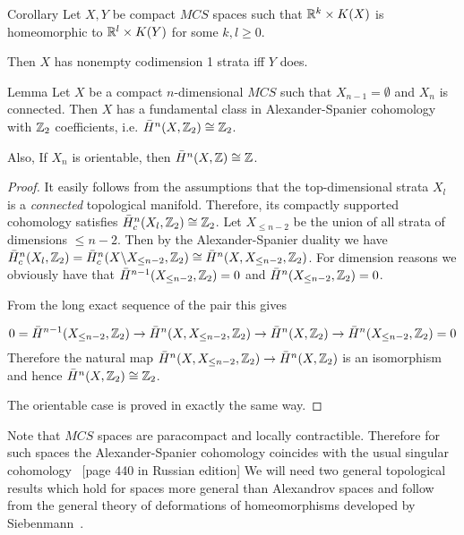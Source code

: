 \begin{thm}{Corollary}
Let $X,Y$ be compact $MCS$ spaces such that $\RR^k\times K(X)$ is homeomorphic to $\RR^l\times K(Y)$ for some $k,l\ge 0$.

Then $X$ has nonempty codimension 1 strata iff $Y$ does.
\end{thm}
\begin{thm}{Lemma}\label{top-gr-pet}
Let $X$ be a  compact $n$-dimensional $MCS$ such that $X_{n-1}=\emptyset$ and $X_n$ is connected. Then $X$ has a fundamental class in Alexander-Spanier cohomology with $\mathbb{Z}_2$ coefficients, i.e. $\bar H^{n}(X,\mathbb{Z}_2)\cong \mathbb{Z}_2$. 

Also, If $X_n$ is orientable, then   $\bar H^{n}(X,\mathbb{Z})\cong \mathbb{Z}$. 
\end{thm}
\begin{proof}
It easily follows from the assumptions that the top-dimensional strata $X_l$ is a {\it connected} topological manifold. Therefore, its compactly supported cohomology satisfies $\bar H^n_c(X_l,\mathbb{Z}_2)\cong \mathbb{Z}_2$.
Let $X_{\le n-2}$ be the union of all strata of dimensions $\le n-2$. Then by the Alexander-Spanier duality we have $\bar H^n_c(X_l,\ZZ_2)=\bar H^n_c(X\backslash X_{\le n-2},\ZZ_2)\cong \bar H^n(X, X_{\le n-2},\ZZ_2)$. 
For dimension reasons we obviously have that $\bar H^{n-1}(X_{\le n-2},\ZZ_2)=0$ and $\bar H^{n}(X_{\le n-2},\ZZ_2)=0$.

From the long exact sequence of the pair this gives

\[
0=\bar H^{n-1}(X_{\le n-2},\ZZ_2)\to \bar H^n(X, X_{\le n-2},\ZZ_2)\to \bar H^n(X,\ZZ_2)\to \bar H^n(X_{\le n-2},\ZZ_2)=0
\]
Therefore the natural map $\bar H^n(X, X_{\le n-2},\ZZ_2)\to \bar H^n(X,\ZZ_2)$ is an isomorphism and hence $\bar H^{n}(X,\mathbb{Z}_2)\cong \mathbb{Z}_2$.

The orientable case is proved in exactly the same way.
\end{proof}

Note that $MCS$ spaces are paracompact and locally contractible. Therefore for such spaces  the Alexander-Spanier cohomology coincides with the usual singular cohomology ~\cite{Spanier}[page 440 in Russian edition]
We will need two general topological results which hold for spaces more general than  Alexandrov spaces and follow from the general theory of deformations of homeomorphisms developed by Siebenmann~\cite{Sieb}.

